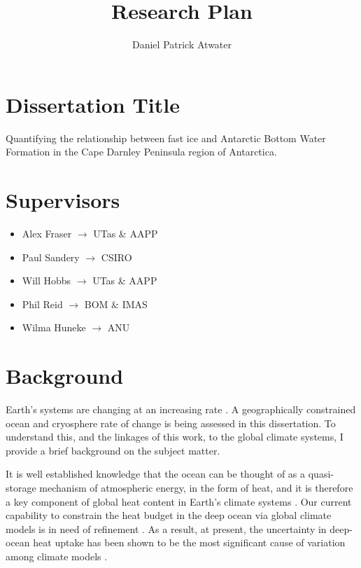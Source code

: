 \documentclass[11pt,a4paper]{article}
\title{Research Plan}
\author{Daniel Patrick Atwater}
\begin{document}
\maketitle
\setcounter{secnumdepth}{1}
\setcounter{tocdepth}{1}
\tableofcontents
\doclicenseThis
\newpage
\section*{Dissertation Title}
%
Quantifying the relationship between fast ice and Antarctic Bottom Water Formation in the Cape Darnley Peninsula region of Antarctica.
\section*{Supervisors}
%
\begin{itemize}
\item Alex Fraser $\rightarrow$ UTas \& AAPP
\item Paul Sandery $\rightarrow$ CSIRO
\item Will Hobbs $\rightarrow$ UTas \& AAPP
\item Phil Reid $\rightarrow$ BOM \& IMAS
\item Wilma Huneke $\rightarrow$ ANU
\end{itemize}
\section*{Background}
%
Earth's systems are changing at an increasing rate \citep{Murphy2009,IPCC2019SpecialReport}. A geographically constrained ocean and cryosphere rate of change is being assessed in this dissertation. To understand this, and the linkages of this work, to the global climate systems, I provide a brief background on the subject matter.

It is well established knowledge that the ocean can be thought of as a quasi-storage mechanism of
atmospheric energy, in the form of heat, and it is therefore a key component of global heat content
in Earth's climate systems \citep{Orsi1995,Levitus2005,Bindoff2007,Purkey2010}. Our current
capability to constrain the heat budget in the deep ocean via global climate models is in need of refinement \citep{Domingues2008,Murphy2009,Purkey2012,Durack2018}. As a result, at present, the uncertainty in deep-ocean heat uptake has been shown to be the most significant cause of variation among climate models \citep{Boe2009,Durack2018}.
\end{document}
